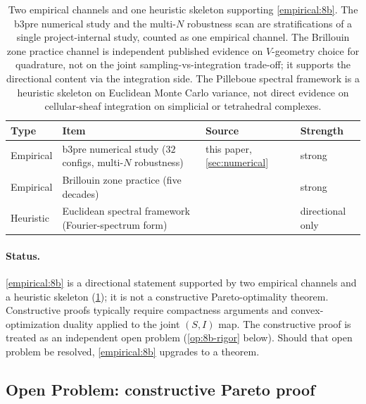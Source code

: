 \begin{table}[h]
\centering
\begin{tabular}{llll}
\toprule
\textbf{Type} & \textbf{Item} & \textbf{Source} & \textbf{Strength} \\
\midrule
Empirical & b3pre numerical study ($32$ configs, multi-$N$ robustness) & this paper, \cref{sec:numerical}      & strong \\
Empirical & Brillouin zone practice (five decades)                       & \cite{Blochl1994,LehmannTaut1972,JepsenAndersen1971} & strong \\
Heuristic & Euclidean spectral framework (Fourier-spectrum form)       & \cite{Pilleboue2015}                   & directional only \\
\bottomrule
\end{tabular}
\caption{Two empirical channels and one heuristic skeleton
  supporting \cref{empirical:8b}. The b3pre numerical study and the
  multi-$N$ robustness scan are stratifications of a single
  project-internal study, counted as one empirical channel. The
  Brillouin zone practice channel is independent published evidence
  on $V$-geometry choice for quadrature, not on the joint
  sampling-vs-integration trade-off; it supports the directional
  content via the integration side. The Pilleboue spectral framework
  is a heuristic skeleton on Euclidean Monte Carlo variance, not
  direct evidence on cellular-sheaf integration on simplicial or
  tetrahedral complexes.}
\label{tab:6-evidence}
\end{table}

\paragraph{Status.}
\cref{empirical:8b} is a directional statement supported by two
empirical channels and a heuristic skeleton (\cref{tab:6-evidence});
it is not a constructive Pareto-optimality theorem. Constructive proofs typically
require compactness arguments and convex-optimization duality applied
to the joint $(S, I)$ map. The constructive proof is treated as an
independent open problem (\cref{op:8b-rigor} below). Should that open
problem be resolved, \cref{empirical:8b} upgrades to a theorem.

\subsection{Open Problem: constructive Pareto proof}\label{subsec:6-op}

